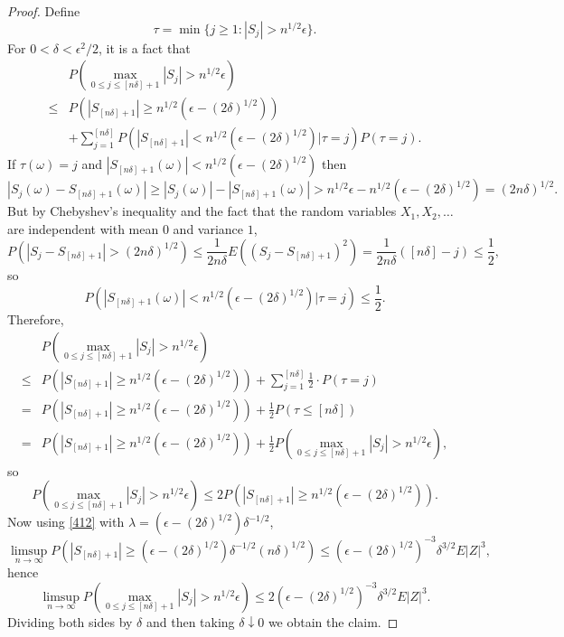 \documentclass{article}
\theoremstyle{definition}
\theoremstyle{definition}
\begin{document}
\begin{proof}
Define
\[
\tau = \min\{j \geq 1: |S_j| > n^{1/2} \epsilon\}.
\]
For $0<\delta<\epsilon^2/2$, it is a fact that
\[
\begin{split}
&P\left( \max_{0 \leq j \leq [n\delta]+1} |S_j| > n^{1/2}\epsilon \right)\\
\leq & P(|S_{[n\delta]+1}| \geq n^{1/2}  (\epsilon - (2\delta)^{1/2}))\\
&+\sum_{j=1}^{[n\delta]} P(|S_{[n\delta]+1}| < n^{1/2}(\epsilon - (2\delta)^{1/2}) | \tau = j) P(\tau = j).
\end{split}
\]
If $\tau(\omega) = j$ and $|S_{[n\delta]+1}(\omega)| < n^{1/2}(\epsilon-(2\delta)^{1/2})$ then
\[
|S_j(\omega) - S_{[n\delta]+1}(\omega)| \geq |S_j(\omega)| - |S_{[n\delta]+1}(\omega)|
>n^{1/2} \epsilon  - n^{1/2}(\epsilon-(2\delta)^{1/2})
=(2n\delta)^{1/2}.
\]
But by Chebyshev's inequality  and the fact that the random variables $X_1,X_2,\ldots$ are independent with mean $0$ and variance $1$,
\[
P( |S_j  -  S_{[n\delta]+1}| > (2n\delta)^{1/2}) \leq \frac{1}{2n\delta} E( (S_j  -  S_{[n\delta]+1})^2)
= \frac{1}{2n\delta} ([n\delta]-j) \leq \frac{1}{2},
\]
so
\[
P(|S_{[n\delta]+1}(\omega)| < n^{1/2}(\epsilon-(2\delta)^{1/2}) | \tau = j) \leq \frac{1}{2}.
\]
Therefore,
\[
\begin{split}
&P\left( \max_{0 \leq j \leq [n\delta]+1} |S_j| > n^{1/2}\epsilon \right)\\
\leq & P(|S_{[n\delta]+1}| \geq n^{1/2}  (\epsilon - (2\delta)^{1/2})) + \sum_{j=1}^{[n\delta]} \frac{1}{2} \cdot P(\tau = j)\\
=&P(|S_{[n\delta]+1}| \geq n^{1/2}  (\epsilon - (2\delta)^{1/2}))  + \frac{1}{2} P(\tau \leq [n\delta])\\
=&P(|S_{[n\delta]+1}| \geq n^{1/2}  (\epsilon - (2\delta)^{1/2}))  + \frac{1}{2} P\left(\max_{0 \leq j \leq [n\delta]+1} |S_j| > n^{1/2} \epsilon \right),
\end{split}
\]
so
\[
P\left( \max_{0 \leq j \leq [n\delta]+1} |S_j| > n^{1/2}\epsilon \right) \leq 2 P(|S_{[n\delta]+1}| \geq n^{1/2}  (\epsilon - (2\delta)^{1/2})).
\]
Now using \eqref{412} with $\lambda =  (\epsilon - (2\delta)^{1/2}) \delta^{-1/2}$, 
\[
\limsup_{n \to \infty} P(|S_{[n\delta]+1}| \geq  (\epsilon - (2\delta)^{1/2}) \delta^{-1/2} (n\delta)^{1/2}) \leq   (\epsilon - (2\delta)^{1/2})^{-3} \delta^{3/2} E|Z|^3,
\]
hence
\[
\limsup_{n \to \infty} P\left( \max_{0 \leq j \leq [n\delta]+1} |S_j| > n^{1/2}\epsilon \right)
\leq 2 (\epsilon - (2\delta)^{1/2})^{-3} \delta^{3/2} E|Z|^3.
\]
Dividing both sides by $\delta$ and then taking $\delta \downarrow 0$ we obtain the claim.
\end{proof}
\end{document}
